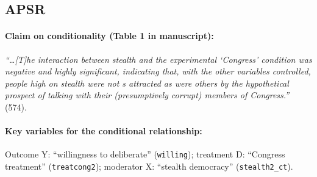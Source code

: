 \documentclass[12pt]{article}
\begin{document}
\clearpage


\subsection{\citet{Neblo2010} APSR} \label{neblo}



\paragraph{Claim on conditionality (Table 1 in manuscript):} \emph{``\ldots[T]he interaction between stealth and the experimental `Congress' condition was negative and highly significant, indicating that, with the other variables controlled, people high on stealth were not s attracted as were others by the hypothetical prospect of talking with their (presumptively corrupt) members of Congress.''} (574). 

\paragraph{Key variables for the conditional relationship:} Outcome Y:
``willingness to deliberate'' (\texttt{willing}); treatment D: ``Congress treatment'' (\texttt{treatcong2}); moderator X: ``stealth democracy''
(\texttt{stealth2\_ct}).


\newpage
\end{document}

